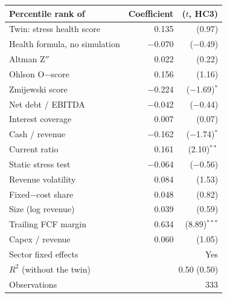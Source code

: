 \begin{tabular}{lrr}
\toprule
Percentile rank of & Coefficient & ($t$, HC3) \\
\midrule
Twin: stress health score & 0.135 & (0.97) \\
Health formula, no simulation & $-$0.070 & ($-$0.49) \\
Altman Z$''$ & 0.022 & (0.22) \\
Ohlson O$-$score & 0.156 & (1.16) \\
Zmijewski score & $-$0.224 & ($-$1.69)$^{*}$ \\
Net debt / EBITDA & $-$0.042 & ($-$0.44) \\
Interest coverage & 0.007 & (0.07) \\
Cash / revenue & $-$0.162 & ($-$1.74)$^{*}$ \\
Current ratio & 0.161 & (2.10)$^{**}$ \\
Static stress test & $-$0.064 & ($-$0.56) \\
Revenue volatility & 0.084 & (1.53) \\
Fixed$-$cost share & 0.048 & (0.82) \\
Size (log revenue) & 0.039 & (0.59) \\
Trailing FCF margin & 0.634 & (8.89)$^{***}$ \\
Capex / revenue & 0.060 & (1.05) \\
\midrule
Sector fixed effects & \multicolumn{2}{r}{Yes} \\
$R^2$ (without the twin) & \multicolumn{2}{r}{0.50 (0.50)} \\
Observations & \multicolumn{2}{r}{333} \\
\bottomrule
\end{tabular}
